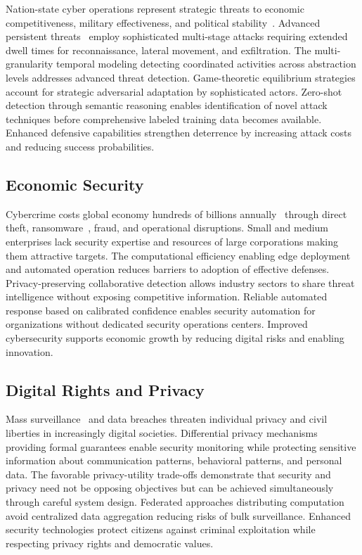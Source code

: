 Nation-state cyber operations represent strategic threats to economic competitiveness, military effectiveness, and political stability~\cite{rid2012cyber}. Advanced persistent threats~\cite{tankard2011advanced} employ sophisticated multi-stage attacks requiring extended dwell times for reconnaissance, lateral movement, and exfiltration. The multi-granularity temporal modeling detecting coordinated activities across abstraction levels addresses advanced threat detection. Game-theoretic equilibrium strategies account for strategic adversarial adaptation by sophisticated actors. Zero-shot detection through semantic reasoning enables identification of novel attack techniques before comprehensive labeled training data becomes available. Enhanced defensive capabilities strengthen deterrence by increasing attack costs and reducing success probabilities.

\subsection*{Economic Security}

Cybercrime costs global economy hundreds of billions annually~\cite{anderson2019measuring} through direct theft, ransomware~\cite{cartwright2019cyber}, fraud, and operational disruptions. Small and medium enterprises lack security expertise and resources of large corporations making them attractive targets. The computational efficiency enabling edge deployment and automated operation reduces barriers to adoption of effective defenses. Privacy-preserving collaborative detection allows industry sectors to share threat intelligence without exposing competitive information. Reliable automated response based on calibrated confidence enables security automation for organizations without dedicated security operations centers. Improved cybersecurity supports economic growth by reducing digital risks and enabling innovation.

\subsection*{Digital Rights and Privacy}

Mass surveillance~\cite{lyon2015surveillance} and data breaches threaten individual privacy and civil liberties in increasingly digital societies. Differential privacy mechanisms~\cite{dwork2006calibrating,dwork2014algorithmic} providing formal guarantees enable security monitoring while protecting sensitive information about communication patterns, behavioral patterns, and personal data. The favorable privacy-utility trade-offs demonstrate that security and privacy need not be opposing objectives but can be achieved simultaneously through careful system design. Federated approaches distributing computation avoid centralized data aggregation reducing risks of bulk surveillance. Enhanced security technologies protect citizens against criminal exploitation while respecting privacy rights and democratic values.

